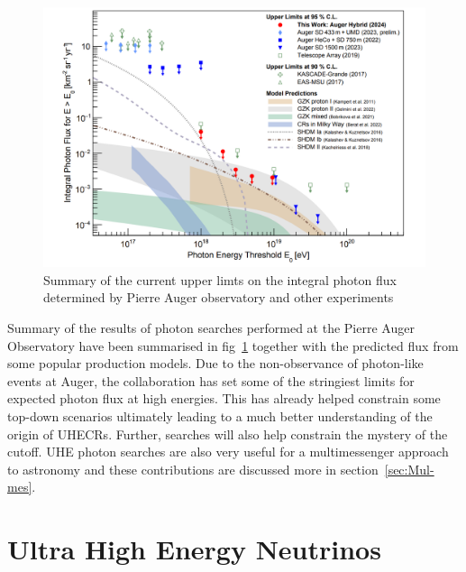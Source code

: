 \begin{figure}[t!]
  \centering
  \includegraphics[width=14.5cm]{thesis_figures/CRnNu/Photon-limits.png}
  \caption{Summary of the current upper limts on the integral photon flux determined by Pierre Auger observatory and other experiments~\cite{PierreAuger:2024ayl}}
  \label{fig:Auger-Photon-limits}
\end{figure}

Summary of the results of photon searches performed at the Pierre Auger Observatory have been summarised in fig~\ref{fig:Auger-Photon-limits} together with the predicted flux from some popular production models. Due to the non-observance of photon-like events at Auger, the collaboration has set some of the stringiest limits for expected photon flux at high energies. This has already helped constrain some top-down scenarios ultimately leading to a much better understanding of the origin of \glspl{UHECR}. Further, searches will also help constrain the mystery of the cutoff. UHE photon searches are also very useful for a multimessenger approach to astronomy and these contributions are discussed more in section~\ref{sec:Mul-mes}.


\section{Ultra High Energy Neutrinos}
\label{sec:UHENu}
